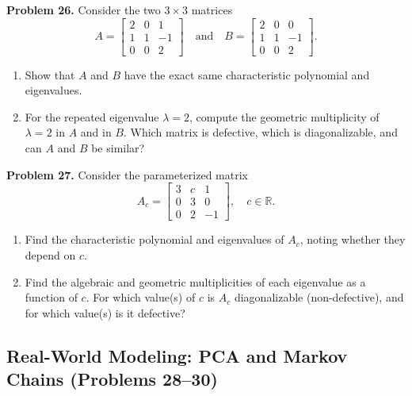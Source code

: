 \documentclass[11pt, letterpaper]{article}
\theoremstyle{definition}
\theoremstyle{remark}
\begin{document}
\noindent\textbf{Problem 26.} Consider the two $3 \times 3$ matrices
\[
A = \begin{bmatrix} 2 & 0 & 1 \\ 1 & 1 & -1 \\ 0 & 0 & 2 \end{bmatrix} \quad \text{and} \quad B = \begin{bmatrix} 2 & 0 & 0 \\ 1 & 1 & -1 \\ 0 & 0 & 2 \end{bmatrix}.
\]
\begin{enumerate}[label=(\alph*), topsep=3pt, itemsep=3pt]
    \item Show that $A$ and $B$ have the exact same characteristic polynomial and eigenvalues.
    \item For the repeated eigenvalue $\lambda = 2$, compute the geometric multiplicity of $\lambda = 2$ in $A$ and in $B$. Which matrix is defective, which is diagonalizable, and can $A$ and $B$ be similar?
\end{enumerate}

\noindent\textbf{Problem 27.} Consider the parameterized matrix
\[
A_c = \begin{bmatrix} 3 & c & 1 \\ 0 & 3 & 0 \\ 0 & 2 & -1 \end{bmatrix}, \quad c \in \mathbb{R}.
\]
\begin{enumerate}[label=(\alph*), topsep=3pt, itemsep=3pt]
    \item Find the characteristic polynomial and eigenvalues of $A_c$, noting whether they depend on $c$.
    \item Find the algebraic and geometric multiplicities of each eigenvalue as a function of $c$. For which value(s) of $c$ is $A_c$ diagonalizable (non-defective), and for which value(s) is it defective?
\end{enumerate}

\subsection{Real-World Modeling: PCA and Markov Chains (Problems 28--30)}
\end{document}
